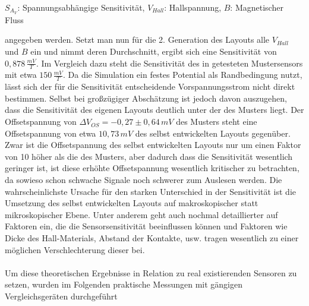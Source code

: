 \documentclass[12pt, a4paper]{article}
\renewcommand{\footnotesize}{\fontsize{10pt}{12pt}\selectfont}
\begin{document}
\vspace{-0.8em}
\begin{center}
	\footnotesize
	$S_{A_V}$: Spannungsabhängige Sensitivität, $V_{Hall}$: Hallspannung, $B$: Magnetischer Fluss
\end{center}
angegeben werden. Setzt man nun für die 2. Generation des Layouts alle $V _{Hall}$ und $B$ ein und nimmt deren Durchschnitt, ergibt sich eine Sensitivität von $0,878\,\frac{mV}{T}$. Im Vergleich dazu steht die Sensitivität des in \cite{cres20} getesteten Mustersensors mit etwa $150\,\frac{mV}{T}$. Da die Simulation ein festes Potential als Randbedingung nutzt, lässt sich der für die Sensitivität entscheidende Vorspannungsstrom nicht direkt bestimmen. Selbst bei großzügiger Abschätzung ist jedoch davon auszugehen, dass die Sensitivität des eigenen Layouts deutlich unter der des Musters liegt.\newline
Der Offsetspannung von $\Delta{V_{OS}}=-0,27\pm0,64\,mV$ des Musters steht eine Offsetspannung von etwa $10,73\,mV$ des selbst entwickelten Layouts gegenüber.\newline
Zwar ist die Offsetspannung des selbst entwickelten Layouts nur um einen Faktor von 10 höher als die des Musters, aber dadurch dass die Sensitivität wesentlich geringer ist, ist diese erhöhte Offsetspannung wesentlich kritischer zu betrachten, da sowieso schon schwache Signale noch schwerer zum Auslesen werden.\newline
Die wahrscheinlichste Ursache für den starken Unterschied in der Sensitivität ist die Umsetzung des selbst entwickelten Layouts auf makroskopischer statt mikroskopischer Ebene. Unter anderem \cite{heidari15} geht auch nochmal detaillierter auf Faktoren ein, die die Sensorsensitivität beeinflussen können und Faktoren wie Dicke des Hall-Materials, Abstand der Kontakte, usw. tragen wesentlich zu einer möglichen Verschlechterung dieser bei.\paragraph{}

Um diese theoretischen Ergebnisse in Relation zu real existierenden Sensoren zu setzen, wurden im Folgenden praktische Messungen mit gängigen Vergleichsgeräten durchgeführt
\end{document}
